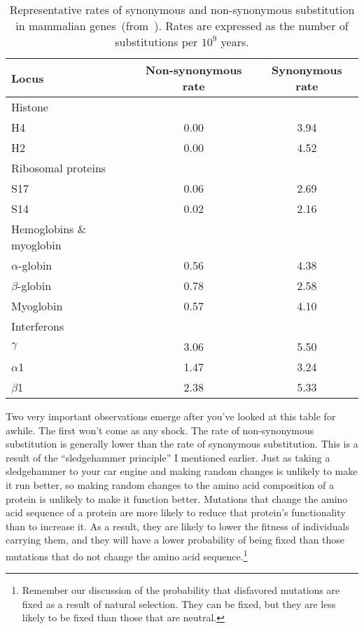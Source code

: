 \documentclass[12pt]{article}
\begin{document}
\begin{table}
\begin{center}
\begin{tabular}{lcc}
\hline\hline
Locus     & Non-synonymous rate & Synonymous rate \\
\hline
Histone \\
\quad H4  & 0.00                & 3.94 \\
\quad H2  & 0.00                & 4.52 \\
Ribosomal proteins \\
\quad S17 & 0.06                & 2.69 \\
\quad S14 & 0.02                & 2.16 \\
Hemoglobins \& myoglobin \\
\quad $\alpha$-globin & 0.56    & 4.38 \\
\quad $\beta$-globin  & 0.78    & 2.58 \\
\quad Myoglobin       & 0.57    & 4.10 \\
Interferons \\
\quad $\gamma$  & 3.06          & 5.50 \\
\quad $\alpha$1 & 1.47          & 3.24 \\
\quad $\beta$1  & 2.38          & 5.33 \\
\hline
\end{tabular}
\end{center}
\caption{Representative rates of synonymous and non-synonymous
  substitution in mammalian genes~(from~\cite{Li97}). Rates are
  expressed as the number of substitutions per $10^9$
  years.}\label{table:substitution-data}
\end{table}

Two very important observations emerge after you've looked at this
table for awhile. The first won't come as any shock. The rate of
non-synonymous substitution is generally lower than the rate of
synonymous substitution. This is a result of the ``sledgehammer
principle'' I mentioned earlier. Just as taking a sledgehammer to your
car engine and making random changes is unlikely to make it run
better, so making random changes to the amino acid composition of a
protein is unlikely to make it function better. Mutations that change
the amino acid sequence of a protein are more likely to reduce that
protein's functionality than to increase it. As a result, they are
likely to lower the fitness of individuals carrying them, and they
will have a lower probability of being fixed than those mutations that
do not change the amino acid sequence.\footnote{Remember 
our discussion of the probability that disfavored mutations are fixed
as a result of natural selection. They can be fixed, but they are less
likely to be fixed than those that are neutral.}
  
\end{document}
